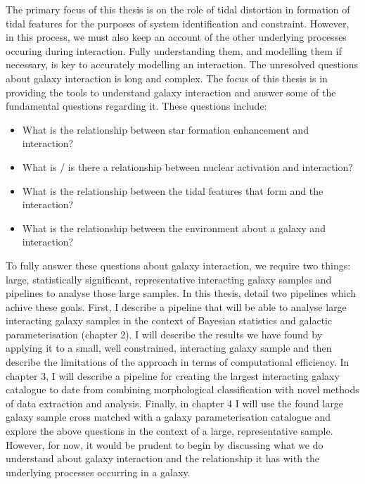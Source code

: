 The primary focus of this thesis is on the role of tidal distortion in formation of tidal features for the purposes of system identification and constraint. However, in this process, we must also keep an account of the other underlying processes occuring during interaction. Fully understanding them, and modelling them if necessary, is key to accurately modelling an interaction. The unresolved questions about galaxy interaction is long and complex. The focus of this thesis is in providing the tools to understand galaxy interaction and answer some of the fundamental questions regarding it. These questions include:

\begin{itemize}
	\item What is the relationship between star formation enhancement and interaction?
	\item What is / is there a relationship between nuclear activation and interaction?
	\item What is the relationship between the tidal features that form and the interaction?
	\item What is the relationship between the environment about a galaxy and interaction?
\end{itemize}

To fully answer these questions about galaxy interaction, we require two things: large, statistically significant, representative interacting galaxy samples and pipelines to analyse those large samples. In this thesis, detail two pipelines which achive these goals. First, I describe a pipeline that will be able to analyse large interacting galaxy samples in the context of Bayesian statistics and galactic parameterisation (chapter 2). I will describe the results we have found by applying it to a small, well constrained, interacting galaxy sample and then describe the limitations of the approach in terms of computational efficiency. In chapter 3, I will describe a pipeline for creating the largest interacting galaxy catalogue to date from combining morphological classification with novel methods of data extraction and analysis. Finally, in chapter 4 I will use the found large galaxy sample cross matched with a galaxy parameterisation catalogue and explore the above questions in the context of a large, representative sample. However, for now, it would be prudent to begin by discussing what we do understand about galaxy interaction and the relationship it has with the underlying processes occurring in a galaxy.

